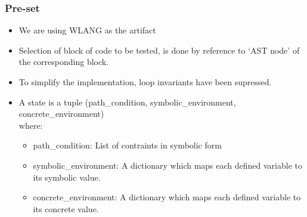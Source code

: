 \documentclass[11pt]{llncs}
\begin{document}
		\subsubsection{Pre-set}
			\begin{itemize}
				\item We are using WLANG as the artifact
				\item Selection of block of code to be tested, is done by reference to ‘AST node’ of the corresponding block.
				\item To simplify the implementation, loop invariants have been supressed.
				\item A state is a tuple (path\_condition, symbolic\_environment, concrete\_environment)\\
					where:
					\begin{itemize}
						\item path\_condition:  List of contraints in symbolic form
						\item symbolic\_environment: A dictionary which maps each defined variable to its symbolic value.
						\item concrete\_environment: A dictionary which maps each defined variable to its concrete value.
					\end{itemize}
			\end{itemize}

		
\end{document}
